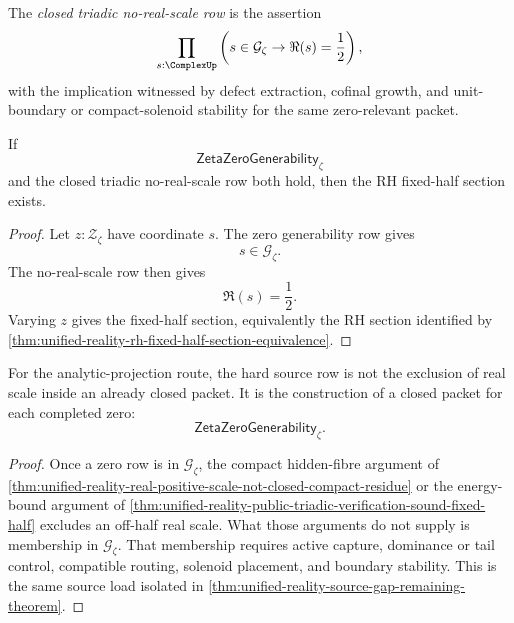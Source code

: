 \begin{definition}
\label{def:unified-reality-closed-triadic-no-real-scale-row}
The \emph{closed triadic no-real-scale row} is the assertion
$$
\prod_{s:\ComplexUp}
\left(
s\in\mathcal G_{\zeta}
\to
\Re(s)=\frac12
\right),
$$
with the implication witnessed by defect extraction, cofinal growth, and
unit-boundary or compact-solenoid stability for the same zero-relevant
packet.
\end{definition}

\begin{theorem}
\label{thm:unified-reality-generability-no-real-scale-conditionally-sufficient}
If
$$
\mathsf{ZetaZeroGenerability}_{\zeta}
$$
and the closed triadic no-real-scale row both hold, then the RH
fixed-half section exists.
\end{theorem}

\begin{proof}
Let $z:\mathcal Z_{\zeta}$ have coordinate $s$.  The zero generability
row gives
$$
s\in\mathcal G_{\zeta}.
$$
The no-real-scale row then gives
$$
\Re(s)=\frac12.
$$
Varying $z$ gives the fixed-half section, equivalently the RH section
identified by
\autoref{thm:unified-reality-rh-fixed-half-section-equivalence}.
\end{proof}

\begin{corollary}
\label{cor:unified-reality-hard-source-row-is-generability}
For the analytic-projection route, the hard source row is not the
exclusion of real scale inside an already closed packet.  It is the
construction of a closed packet for each completed zero:
$$
\mathsf{ZetaZeroGenerability}_{\zeta}.
$$
\end{corollary}

\begin{proof}
Once a zero row is in $\mathcal G_{\zeta}$, the compact hidden-fibre
argument of
\autoref{thm:unified-reality-real-positive-scale-not-closed-compact-residue}
or the energy-bound argument of
\autoref{thm:unified-reality-public-triadic-verification-sound-fixed-half}
excludes an off-half real scale.  What those arguments do not supply is
membership in $\mathcal G_{\zeta}$.  That membership requires active
capture, dominance or tail control, compatible routing, solenoid
placement, and boundary stability.  This is the same source load
isolated in
\autoref{thm:unified-reality-source-gap-remaining-theorem}.
\end{proof}

